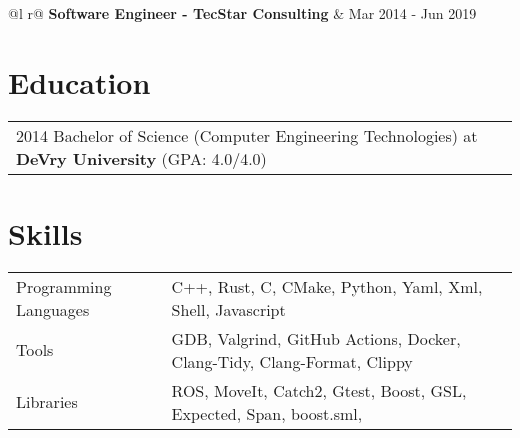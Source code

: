 \documentclass[a4paper,12pt]{article}
\begin{document}
\begin{tabularx}{\linewidth}{ @{}l r@{} }
\textbf{Software Engineer - TecStar Consulting} & \hfill Mar 2014 - Jun 2019 \\[3.75pt]
\end{tabularx}

\section{Education}
\begin{tabularx}{\linewidth}{@{}l X@{}}
2014 Bachelor of Science (Computer Engineering Technologies) at \textbf{DeVry University} \hfill \normalsize (GPA: 4.0/4.0)
\end{tabularx}

\section{Skills}
\begin{tabularx}{\linewidth}{@{}l X@{}}
Programming Languages &  \normalsize{C++, Rust, C, CMake, Python, Yaml, Xml, Shell, Javascript}\\
Tools  &  \normalsize{GDB, Valgrind, GitHub Actions, Docker, Clang-Tidy, Clang-Format, Clippy}\\
Libraries  &  \normalsize{ROS, MoveIt, Catch2, Gtest, Boost, GSL, Expected, Span, boost.sml, }\\
\end{tabularx}
\end{document}
